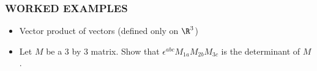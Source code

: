 {
\begin{frame}
  \frametitle{\alert{WORKED EXAMPLES}}
  \begin{itemize}[<+-|alert@+>]
  \item Vector product of vectors (defined only on $\R^3$)
  \item Let $M$ be a 3 by 3 matrix. Show that $\epsilon^{abc} M_{1a}M_{2b}M_{3c}$ is the determinant of $M$.
  \end{itemize}
\end{frame}
}

